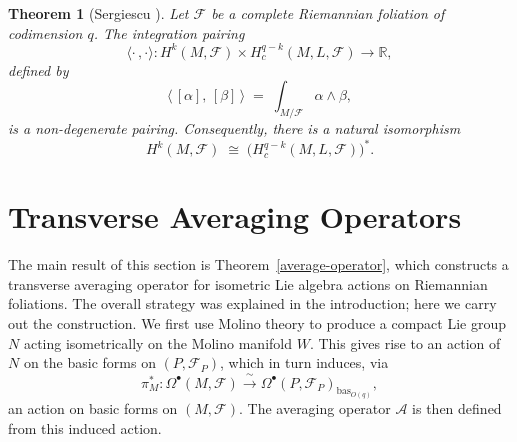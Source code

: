 \documentclass[reqno, 11pt]{amsart}
\newtheorem{thm}{Theorem}[section]
\theoremstyle{definition}
\theoremstyle{property}
\theoremstyle{remark}
\numberwithin{equation}{section}
\begin{document}

\begin{thm}[Sergiescu {\cite{Ser85}}]\label{Ser}
Let $\mathcal{F}$ be a complete Riemannian foliation of codimension $q$. The integration pairing
\begin{equation}\label{eq:poincare-pairing}
\langle \cdot\,,\cdot \rangle \colon
H^k(M, \mathcal{F}) \times H_c^{q-k}(M, L, \mathcal{F})
\longrightarrow \mathbb{R},
\end{equation}
defined by
\begin{equation}
\langle\, [\alpha],\, [\beta]\, \rangle
\;=\; \int_{M/\mathcal{F}} \alpha \wedge \beta,
\end{equation}
is a non-degenerate pairing. Consequently, there is a natural isomorphism
\begin{equation}
H^k(M, \mathcal{F}) \;\cong\; \bigl(H_c^{q-k}(M, L, \mathcal{F})\bigr)^*.
\end{equation}
\end{thm}







\section{Transverse Averaging Operators}\label{sec:averaging-operator}
 
The main result of this section is Theorem~\ref{average-operator}, which
constructs a transverse averaging operator for isometric Lie algebra actions on
Riemannian foliations. The overall strategy was explained in the introduction;
here we carry out the construction. We first use Molino theory to produce a
compact Lie group $N$ acting isometrically on the Molino manifold $W$. This
gives rise to an action of $N$ on the basic forms on $(P,\mathcal F_P)$, which
in turn induces, via
\[
\pi_M^*:\Omega^\bullet(M,\mathcal{F})\xrightarrow{\;\sim\;}
\Omega^\bullet(P,\mathcal{F}_P)_{\mathrm{bas}_{O(q)}},
\]
an action on basic forms on $(M,\mathcal F)$. The averaging operator
$\mathcal A$ is then defined from this induced action.
\end{document}
